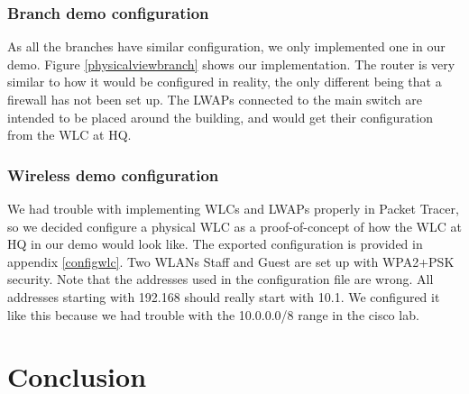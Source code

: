 
\subsubsection{Branch demo configuration}


As all the branches have similar configuration, we only implemented one in our demo. Figure \ref{physicalviewbranch} shows our implementation. %
The router is very similar to how it would be configured in reality, the only different being that a firewall has not been set up. The LWAPs connected to the main switch are intended to be placed around the building, and would get their configuration from the WLC at HQ.

\subsubsection{Wireless demo configuration} \label{demowireless}

We had trouble with implementing WLCs and LWAPs properly in Packet Tracer, so we decided configure a physical WLC as a proof-of-concept of how the WLC at HQ in our demo would look like. The exported configuration is provided in appendix \ref{configwlc}. Two WLANs Staff and Guest are set up with WPA2+PSK security. Note that the addresses used in the configuration file are wrong. All addresses starting with 192.168 should really start with 10.1. We configured it like this because we had trouble with the 10.0.0.0/8 range in the cisco lab.

\section{Conclusion}



\clearpage %

\nocite{*}


